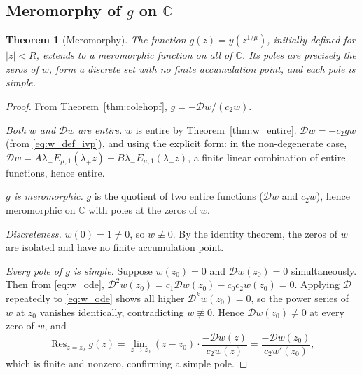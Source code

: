 \documentclass[12pt,a4paper]{amsart}
\DeclareMathOperator{\Res}{Res}
\newcommand{\ML}[2]{E_{#1,#2}}
\theoremstyle{plain}
\newtheorem{theorem}{Theorem}[section]
\theoremstyle{definition}
\theoremstyle{remark}
\begin{document}
\subsection{Meromorphy of $g$ on $\mathbb{C}$}

\begin{theorem}[Meromorphy]\label{thm:meromorphic}
The function $g(z)=y(z^{1/\mu})$, initially defined for $|z|<R$, extends to
a meromorphic function on all of $\mathbb{C}$. Its poles are precisely the
zeros of $w$, form a discrete set with no finite accumulation point, and each
pole is simple.
\end{theorem}

\begin{proof}
From Theorem~\ref{thm:colehopf}, $g=-\mathcal{D}w/(c_2 w)$.

\emph{Both $w$ and $\mathcal{D}w$ are entire.}
$w$ is entire by Theorem~\ref{thm:w_entire}.
$\mathcal{D}w = -c_2 gw$ (from \eqref{eq:w_def_ivp}), and using
the explicit form: in the non-degenerate case,
$\mathcal{D}w=A\lambda_+\ML{\mu}{1}(\lambda_+ z)+B\lambda_-\ML{\mu}{1}(\lambda_- z)$,
a finite linear combination of entire functions, hence entire.

\emph{$g$ is meromorphic.}
$g$ is the quotient of two entire functions ($\mathcal{D}w$ and $c_2 w$),
hence meromorphic on $\mathbb{C}$ with poles at the zeros of $w$.

\emph{Discreteness.}
$w(0)=1\ne 0$, so $w\not\equiv 0$. By the identity theorem, the zeros
of $w$ are isolated and have no finite accumulation point.

\emph{Every pole of $g$ is simple.}
Suppose $w(z_0)=0$ and $\mathcal{D}w(z_0)=0$ simultaneously. Then
from \eqref{eq:w_ode},
$\mathcal{D}^2 w(z_0)=c_1\mathcal{D}w(z_0)-c_0 c_2 w(z_0)=0$.
Applying $\mathcal{D}$ repeatedly to \eqref{eq:w_ode} shows all higher
$\mathcal{D}^k w(z_0)=0$, so the power series of $w$ at $z_0$ vanishes
identically, contradicting $w\not\equiv 0$. Hence $\mathcal{D}w(z_0)\ne 0$
at every zero of $w$, and
\[
  \Res_{z=z_0}g(z)
  = \lim_{z\to z_0}(z-z_0)\cdot\frac{-\mathcal{D}w(z)}{c_2 w(z)}
  = \frac{-\mathcal{D}w(z_0)}{c_2 w'(z_0)},
\]
which is finite and nonzero, confirming a simple pole.
\end{proof}
\end{document}
